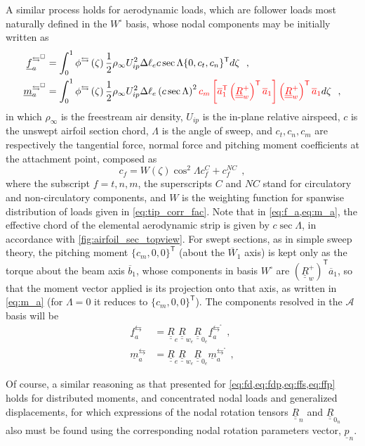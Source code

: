 \documentclass[12pt,a4paper,oneside,english]{abntex2} %
\newcommand{\fix}[1]{{\color{red}#1}}
\newcommand{\vect}[1]{\underline{#1}}
\newcommand{\uvec}[1]{\overline{#1}}
\def\tens#1{\underline{\underline{#1}}}
\def\lb{\left[}
\def\rb{\right]}
\def\lp{\left(}
\def\rp{\right)}
\def\T{\mathsf{T}}
\def\A{\mathcal{A}}
\def\Ws{W^{\square}}
\def\aone{\uvec{a}_1}
\def\R{\tens{R}}
\def\Rw{\R_w}
\def\p{\vect{p}}
\def\f{\vect{f}}
\def\m{\vect{m}}
\def\Deltal{\Delta \ell_e}
\def\Re{\R_{e}}
\def\Rwe{\R_{w_e}}
\def\Rze{\R_{0_e}}
\begin{document}
\begin{apendicesenv}
A similar process holds for aerodynamic loads, which are follower loads most naturally defined in the $\Ws$ basis, whose nodal components may be initially written as
\begin{align}
    \f_{a}^{\leftrightarrows^\square} &= \int_0^1 \phi^\leftrightarrows\lp\zeta\rp\frac{1}{2}\rho_{\infty}U_{ip}^2 \Deltal c\sec\Lambda\{0,c_t,c_n\}^\T d\zeta \ \ ,
    \label{eq:f_a}
    \\
    \m_{a}^{\leftrightarrows^\square} &= \int_0^1 \phi^\leftrightarrows\lp\zeta\rp\frac{1}{2}\rho_{\infty} U_{ip}^2 \Deltal \lp c \sec\Lambda\rp^2 \fix{c_m\lb\aone^\T\lp\Rw^+\rp^\T\aone\rb\lp\Rw^+\rp^\T\aone} d\zeta \ \ ,
    \label{eq:m_a}
\end{align}
in which $\rho_{\infty}$ is the freestream air density, $U_{ip}$ is the in-plane relative airspeed, $c$ is the unswept airfoil section chord, $\Lambda$ is the angle of sweep, and $c_t,c_n,c_m$ are respectively the tangential force, normal force and pitching moment coefficients at the attachment point, composed as
\begin{equation}
    c_f = W\lp\zeta\rp\cos^2\Lambda c_f^C + c_f^{NC} \ \ ,
    \label{eq:cfC_cfNC}
\end{equation}
where the subscript $f=t,n,m$, the superscripts $C$ and $NC$ stand for circulatory and non-circulatory components, and $W$ is the weighting function for spanwise distribution of loads given in \cref{eq:tip_corr_fac}. Note that in \cref{eq:f_a,eq:m_a}, the effective chord of the elemental aerodynamic strip is given by $c\sec\Lambda$, in accordance with \cref{fig:airfoil_sec_topview}. \fix{For swept sections, as in simple sweep theory, the pitching moment $\{c_m,0,0\}^\T$ (about the $\uvec{W}_1$ axis) is kept only as the torque about the beam axis $\uvec{b}_1$, whose components in basis $\Ws$ are $\lp\Rw^+\rp^\T\aone$, so that the moment vector applied is its projection onto that axis, as written in \cref{eq:m_a} (for $\Lambda=0$ it reduces to $\{c_m,0,0\}^\T$).} The components resolved in the $\A$ basis will be
\begin{align}
    \f_a^\leftrightarrows &= \Re\Rwe\Rze\f_{a}^{\leftrightarrows^\square} \ \ ,
    \label{eq:fa}
    \\
    \m_a^\leftrightarrows &= \Re\Rwe\Rze\m_{a}^{\leftrightarrows^\square} \ \ ,
    \label{eq:ma}
\end{align}

Of course, a similar reasoning as that presented for \cref{eq:fd,eq:fdp,eq:ffs,eq:ffp} holds for distributed moments, and concentrated nodal loads and generalized displacements, for which expressions of the nodal rotation tensors $\R_n$ and $\R_{0_n}$ also must be found using the corresponding nodal rotation parameters vector, $\p_n$.


\end{apendicesenv}
\end{document}
